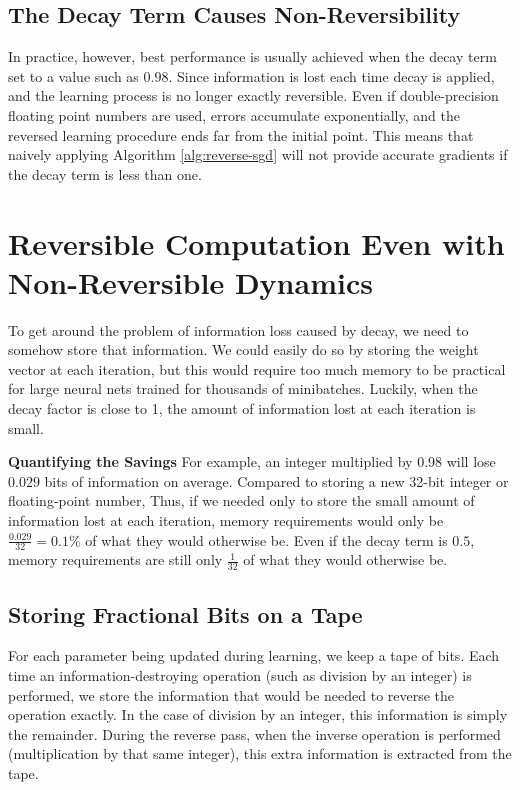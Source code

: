 \documentclass{article}
\begin{document}
\subsection{The Decay Term Causes Non-Reversibility}
In practice, however, best performance is usually achieved when the decay term set to a value such as $0.98$.
Since information is lost each time decay is applied, and the learning process is no longer exactly reversible.
Even if double-precision floating point numbers are used, errors accumulate exponentially, and the reversed learning procedure ends far from the initial point.
This means that naively applying Algorithm \ref{alg:reverse-sgd} will not provide accurate gradients if the decay term is less than one.

\section{Reversible Computation Even with Non-Reversible Dynamics}

To get around the problem of information loss caused by decay, we need to somehow store that information.
We could easily do so by storing the weight vector at each iteration, but this would require too much memory to be practical for large neural nets trained for thousands of minibatches.
Luckily, when the decay factor is close to 1, the amount of information lost at each iteration is small.

\textbf{Quantifying the Savings}
For example, an integer multiplied by 0.98 will lose $0.029$ bits of information on average.
Compared to storing a new 32-bit integer or floating-point number, 
Thus, if we needed only to store the small amount of information lost at each iteration, memory requirements would only be ${\frac{0.029}{32} = 0.1\%}$ of what they would otherwise be.
Even if the decay term is $0.5$, memory requirements are still only $\frac{1}{32}$ of what they would otherwise be.

\subsection{Storing Fractional Bits on a Tape}

For each parameter being updated during learning, we keep a tape of bits.
Each time an information-destroying operation (such as division by an integer) is performed, we store the information that would be needed to reverse the operation exactly.  In the case of division by an integer, this information is simply the remainder.
During the reverse pass, when the inverse operation is performed (multiplication by that same integer), this extra information is extracted from the tape.
\end{document}
